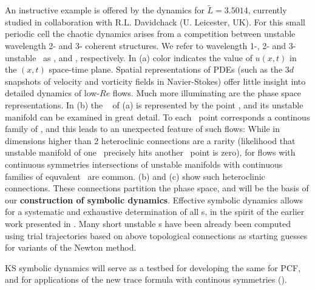 An instructive 
example is offered by the dynamics for $\tilde{L}=3.5014$, %
currently studied in collaboration with
R.L. Davidchack (U. Leicester, UK).
For this small periodic cell
the chaotic dynamics arises from
a competition between unstable
wavelength 2- and 3- coherent structures.
We refer to wavelength 1-, 2- and 3- unstable \eqva\ as
, and ,
respectively.
In  (a)
color indicates the value of $u(x,t)$ in 
the $(x,t)$ space-time plane.
Spatial representations of
PDEs (such as the 3$d$
snapshots of velocity and vorticity fields in Navier-Stokes)
offer little insight into detailed dynamics of low-$Re$ flows.
Much more illuminating are the phase space representations.
In  (b) the \eqv\  of
 (a) is represented by the point ,
and its unstable manifold can be examined in great detail.
To each \eqv\ point corresponds a continous family
of \eqva, and this leads to an unexpected feature of such
flows: While in dimensions higher than 2 heteroclinic connections 
are a rarity (likelihood that unstable manifold of one
 \eqv\ precisely hits another \eqv\ point is zero), 
for flows with continuous symmetries intersections of unstable
manifolds with continuous families of equvalent \eqva\ are common.
 (b) and (c) show 
such heteroclinic connections.
These connections partition the phase space,
and will be the basis of our
{\bf construction of symbolic dynamics}.
Effective symbolic dynamics allows
for a systematic and exhaustive determination 
of all \rpo s, in the spirit of 
the earlier work presented in .
Many short unstable \rpo s have been already 
been computed using trial trajectories based on above
topological connections as starting  guesses 
for variants of the Newton method.

KS symbolic dynamics will
serve as a testbed for developing the
same for PCF, and for applications of the new
trace formula with continous symmetries ().

